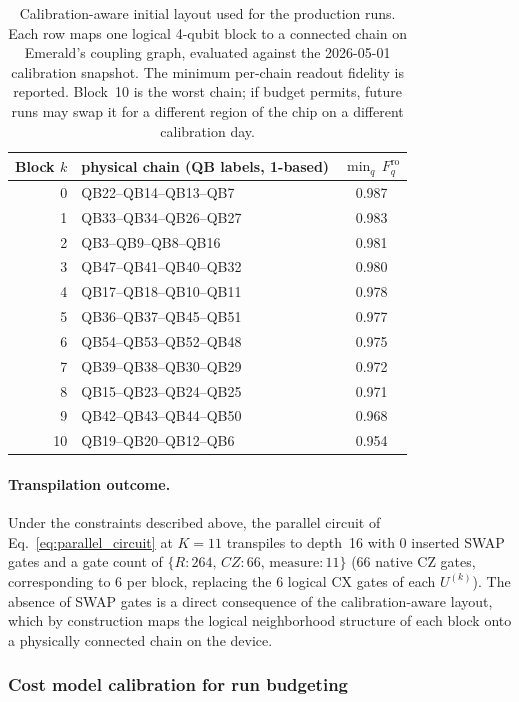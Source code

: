 \begin{table}[h]
\centering
\caption{Calibration-aware initial layout used for the production runs. Each row maps one logical 4-qubit block to a connected chain on Emerald's coupling graph, evaluated against the 2026-05-01 calibration snapshot. The minimum per-chain readout fidelity is reported. Block~10 is the worst chain; if budget permits, future runs may swap it for a different region of the chip on a different calibration day.}
\label{tab:initial_layout}
\begin{tabular}{rlc}
\toprule
Block $k$ & physical chain (QB labels, 1-based) & $\min_q\, F^{\mathrm{ro}}_q$ \\
\midrule
0  & QB22--QB14--QB13--QB7   & 0.987 \\
1  & QB33--QB34--QB26--QB27  & 0.983 \\
2  & QB3--QB9--QB8--QB16     & 0.981 \\
3  & QB47--QB41--QB40--QB32  & 0.980 \\
4  & QB17--QB18--QB10--QB11  & 0.978 \\
5  & QB36--QB37--QB45--QB51  & 0.977 \\
6  & QB54--QB53--QB52--QB48  & 0.975 \\
7  & QB39--QB38--QB30--QB29  & 0.972 \\
8  & QB15--QB23--QB24--QB25  & 0.971 \\
9  & QB42--QB43--QB44--QB50  & 0.968 \\
10 & QB19--QB20--QB12--QB6   & 0.954 \\
\bottomrule
\end{tabular}
\end{table}

\paragraph{Transpilation outcome.}
Under the constraints described above, the parallel circuit of Eq.~\ref{eq:parallel_circuit} at $K=11$ transpiles to depth~16 with 0 inserted SWAP gates and a gate count of $\{R: 264,\, CZ: 66,\, \mathrm{measure}: 11\}$ (66 native CZ gates, corresponding to 6 per block, replacing the 6 logical CX gates of each $U^{(k)}$). The absence of SWAP gates is a direct consequence of the calibration-aware layout, which by construction maps the logical neighborhood structure of each block onto a physically connected chain on the device.

\subsubsection{Cost model calibration for run budgeting}
\label{subsec:cost_model}

